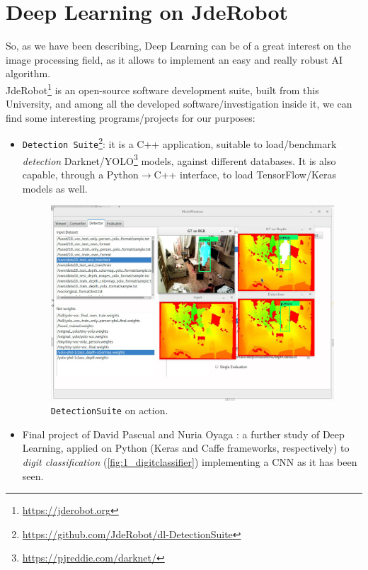 \section{Deep Learning on JdeRobot}
\label{sec:dl_jderobot}
So, as we have been describing, Deep Learning can be of a great interest on the image processing field, as it allows to implement an easy and really robust AI algorithm.\\

JdeRobot\footnote{\url{https://jderobot.org}} is an open-source software development suite, built from  this University, and among all the developed software/investigation inside it, we can find some interesting programs/projects for our purposes:

\begin{itemize}
	\item \texttt{Detection Suite}\footnote{\url{https://github.com/JdeRobot/dl-DetectionSuite}}: it is a C++ application, suitable to load/benchmark \textit{detection} Darknet/YOLO\footnote{\url{https://pjreddie.com/darknet/}} models, against different databases. It is also capable, through a Python$\rightarrow$C++ interface, to load TensorFlow/Keras models as well.
	
	\begin{figure}[h]
		\centering
		\includegraphics[width=4.5in]{images/detection_suite_depth}
		\caption{\texttt{DetectionSuite} on action.}
		\label{fig:1_detectionsuite}
	\end{figure}

	\item Final project of David Pascual \cite{dpascualhe} and Nuria Oyaga \cite{noyaga}: a further study of Deep Learning, applied on Python (Keras and Caffe frameworks, respectively) to \textit{digit classification} (\autoref{fig:1_digitclassifier}) implementing a CNN as it has been seen.
	

\end{itemize}
